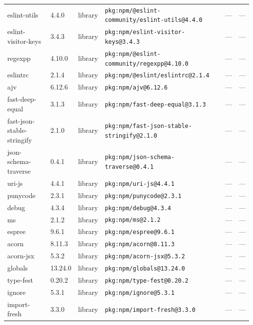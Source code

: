 \documentclass[11pt,a4paper]{article}
\begin{document}
\begin{longtable}{|p{4cm}|p{2cm}|p{1.6cm}|p{5cm}|p{1.5cm}|p{3.5cm}|}
\raggedright eslint-utils & 4.4.0 & library & \small\texttt{pkg:npm/@eslint-community/eslint-utils@4.4.0} & — & \small — \\
\raggedright eslint-visitor-keys & 3.4.3 & library & \small\texttt{pkg:npm/eslint-visitor-keys@3.4.3} & — & \small — \\
\raggedright regexpp & 4.10.0 & library & \small\texttt{pkg:npm/@eslint-community/regexpp@4.10.0} & — & \small — \\
\raggedright eslintrc & 2.1.4 & library & \small\texttt{pkg:npm/@eslint/eslintrc@2.1.4} & — & \small — \\
\raggedright ajv & 6.12.6 & library & \small\texttt{pkg:npm/ajv@6.12.6} & — & \small — \\
\raggedright fast-deep-equal & 3.1.3 & library & \small\texttt{pkg:npm/fast-deep-equal@3.1.3} & — & \small — \\
\raggedright fast-json-stable-stringify & 2.1.0 & library & \small\texttt{pkg:npm/fast-json-stable-stringify@2.1.0} & — & \small — \\
\raggedright json-schema-traverse & 0.4.1 & library & \small\texttt{pkg:npm/json-schema-traverse@0.4.1} & — & \small — \\
\raggedright uri-js & 4.4.1 & library & \small\texttt{pkg:npm/uri-js@4.4.1} & — & \small — \\
\raggedright punycode & 2.3.1 & library & \small\texttt{pkg:npm/punycode@2.3.1} & — & \small — \\
\raggedright debug & 4.3.4 & library & \small\texttt{pkg:npm/debug@4.3.4} & — & \small — \\
\raggedright ms & 2.1.2 & library & \small\texttt{pkg:npm/ms@2.1.2} & — & \small — \\
\raggedright espree & 9.6.1 & library & \small\texttt{pkg:npm/espree@9.6.1} & — & \small — \\
\raggedright acorn & 8.11.3 & library & \small\texttt{pkg:npm/acorn@8.11.3} & — & \small — \\
\raggedright acorn-jsx & 5.3.2 & library & \small\texttt{pkg:npm/acorn-jsx@5.3.2} & — & \small — \\
\raggedright globals & 13.24.0 & library & \small\texttt{pkg:npm/globals@13.24.0} & — & \small — \\
\raggedright type-fest & 0.20.2 & library & \small\texttt{pkg:npm/type-fest@0.20.2} & — & \small — \\
\raggedright ignore & 5.3.1 & library & \small\texttt{pkg:npm/ignore@5.3.1} & — & \small — \\
\raggedright import-fresh & 3.3.0 & library & \small\texttt{pkg:npm/import-fresh@3.3.0} & — & \small — \\

\end{longtable}
\end{document}
